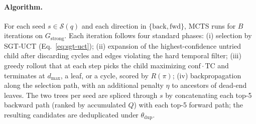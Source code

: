 \documentclass{opendatalab}
\begin{document}

\paragraph{Algorithm.}
For each seed $s\in\mathcal{S}(q)$ and each direction in $\{\text{back},\text{fwd}\}$, MCTS runs for $B$
iterations on $G_{\text{strong}}$. Each iteration follows four standard phases: (i) selection by SGT-UCT
(Eq.~\ref{eq:sgt-uct}); (ii) expansion of the highest-confidence untried child after discarding cycles and edges
violating the hard temporal filter; (iii) greedy rollout that at each step picks the child maximizing
$\mathrm{conf}\cdot\mathrm{TC}$ and terminates at $d_{\max}$, a leaf, or a cycle, scored by $R(\pi)$;
(iv) backpropagation along the selection path, with an additional penalty $\eta$ to ancestors of dead-end leaves.
The two trees per seed are spliced through $s$ by concatenating each top-5 backward path (ranked by accumulated
$Q$) with each top-5 forward path; the resulting candidates are deduplicated under $\theta_{\text{dup}}$.

\end{document}
